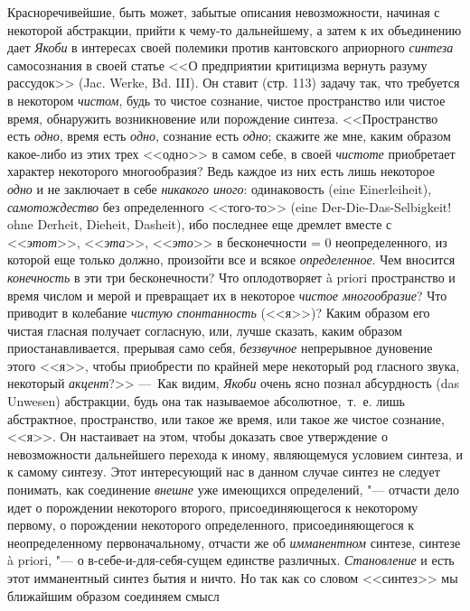 Красноречивейшие, быть может, забытые описания невозможности, начиная с
некоторой абстракции, прийти к чему-то дальнейшему, а затем к их
объединению дает {\em Якоби} в интересах своей полемики
против кантовского априорного {\em синтеза}
самосознания в своей статье <<О предприятии критицизма вернуть разуму
рассудок>> (Jac. Werke, Bd. III). Он ставит (стр. 113) задачу так, что
требуется в некотором {\em чистом}, будь то чистое
сознание, чистое пространство или чистое время, обнаружить возникновение
или порождение синтеза. <<Пространство есть {\em одно},
время есть {\em одно}, сознание есть
{\em одно}; скажите же мне, каким образом какое-либо из
этих трех <<одно>> в самом себе, в своей {\em чистоте}
приобретает характер некоторого многообразия? Ведь каждое из них есть лишь
некоторое {\em одно} и не заключает в себе
{\em никакого иного}: одинаковость (eine
Einerleiheit), {\em самотождество} без определенного
<<того-то>> (eine Der-Die-Das-Selbigkeit! ohne Derheit, Dieheit, Dasheit),
ибо последнее еще дремлет вместе с <<{\em этот}>>,
<<{\em эта}>>, <<{\em это}>> в
бесконечности = 0 неопределенного, из которой еще только должно, произойти
все и всякое {\em определенное}. Чем вносится
{\em конечность} в эти три бесконечности? Что
оплодотворяет à priori пространство и время числом и мерой и превращает их
в некоторое {\em чистое многообразие}? Что приводит в
колебание {\em чистую спонтанность} (<<я>>)? Каким
образом его чистая гласная получает согласную, или, лучше сказать, каким
образом приостанавливается, прерывая само себя,
{\em беззвучное} непрерывное дуновение этого <<я>>, чтобы
приобрести по крайней мере некоторый род гласного звука, некоторый
{\em акцент}?>> ---~Как видим,
{\em Якоби} очень ясно познал абсурдность (das Unwesen)
абстракции, будь она так называемое абсолютное,~т.~е. лишь абстрактное,
пространство, или такое же время, или такое же чистое сознание, <<я>>. Он
настаивает на этом, чтобы доказать свое утверждение о невозможности
дальнейшего перехода к иному, являющемуся условием синтеза, и к самому
синтезу. Этот интересующий нас в данном случае синтез не следует понимать,
как соединение {\em внешне} уже имеющихся определений,
"--- отчасти дело идет о порождении некоторого второго, присоединяющегося к
некоторому первому, о порождении некоторого определенного,
присоединяющегося к неопределенному первоначальному, отчасти же об
{\em имманентном} синтезе, синтезе à priori, "--- о
в-себе-и-для-себя-сущем единстве различных.
{\em Становление} и есть этот имманентный синтез бытия
и ничто. Но так как со словом <<синтез>> мы ближайшим образом соединяем смысл
